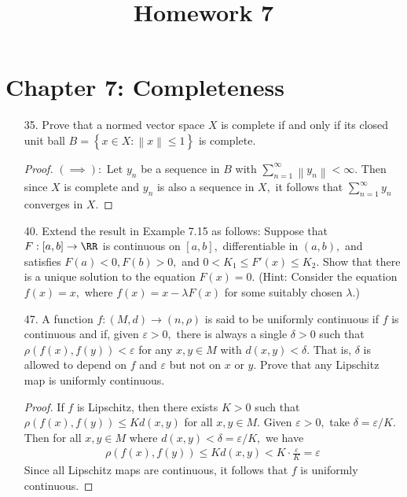 \documentclass{article}
\begin{document}
\title{Homework 7} 
\maketitle
\thispagestyle{fancy}

\section*{Chapter 7: Completeness}

\begin{itemize}
	\item[35.] Prove that a normed vector space $X$ is complete if and only if its closed unit ball $B=\left\{ x\in X:\left\lVert x \right\rVert\le 1 \right\}$ is complete.
		\begin{proof}
			$(\implies):$ Let $y_n$ be a sequence in $B$ with $\sum_{n=1}^{\infty} \left\lVert y_n \right\rVert<\infty.$ Then since $X$ is complete and $y_n$ is also a sequence in $X,$ it follows that $\sum_{n=1}^{\infty} y_n$ converges in $X.$ 
		\end{proof}

	\item[40.] Extend the result in Example 7.15 as follows: Suppose that $F:[a, b]\to \RR$ is continuous on $[a, b],$ differentiable in $(a, b),$ and satisfies $F(a)<0, F(b)>0,$ and $0<K_1\le F'(x)\le K_2.$ Show that there is a unique solution to the equation $F(x)=0.$ (Hint: Consider the equation $f(x)=x,$ where $f(x)=x-\lambda F(x)$ for some suitably chosen $\lambda$.)

	\item[47.] A function $f:(M, d)\to (n, \rho)$ is said to be uniformly continuous if $f$ is continuous and if, given $\varepsilon>0,$ there is always a single $\delta>0$ such that $\rho(f(x), f(y))<\varepsilon$ for any $x, y\in M$ with $d(x, y)<\delta.$ That is, $\delta$ is allowed to depend on $f$ and $\varepsilon$ but not on $x$ or $y.$ Prove that any Lipschitz map is uniformly continuous.
		\begin{proof}
			If $f$ is Lipschitz, then there exists $K>0$ such that $\rho(f(x), f(y))\le Kd(x, y)$ for all $x, y\in M.$ Given $\varepsilon>0,$ take $\delta=\varepsilon/K.$ Then for all $x, y\in M$ where $d(x, y)<\delta=\varepsilon/K,$ we have
			\begin{align*}
				\rho(f(x), f(y))\le Kd(x, y)< K\cdot \frac{\varepsilon}{K} = \varepsilon
			\end{align*}
			Since all Lipschitz maps are continuous, it follows that $f$ is uniformly continuous.
		\end{proof}
		
\end{itemize}
\end{document}
